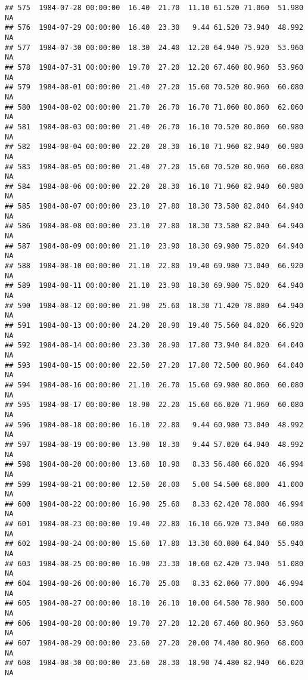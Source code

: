 \documentclass{article}\usepackage{graphicx, color}
\makeatletter
\newenvironment{kframe}{%
 \def\at@end@of@kframe{}%
 \ifinner\ifhmode%
  \def\at@end@of@kframe{\end{minipage}}%
  \begin{minipage}{\columnwidth}%
 \fi\fi%
 \def\FrameCommand##1{\hskip\@totalleftmargin \hskip-\fboxsep
 \colorbox{shadecolor}{##1}\hskip-\fboxsep
     \hskip-\linewidth \hskip-\@totalleftmargin \hskip\columnwidth}%
 \MakeFramed {\advance\hsize-\width
   \@totalleftmargin\z@ \linewidth\hsize
   \@setminipage}}%
 {\par\unskip\endMakeFramed%
 \at@end@of@kframe}
\newenvironment{knitrout}{}{} %
\makeatother
\begin{document}
\begin{knitrout}
\begin{kframe}
\begin{verbatim}
## 575  1984-07-28 00:00:00  16.40  21.70  11.10 61.520 71.060  51.980     NA
## 576  1984-07-29 00:00:00  16.40  23.30   9.44 61.520 73.940  48.992     NA
## 577  1984-07-30 00:00:00  18.30  24.40  12.20 64.940 75.920  53.960     NA
## 578  1984-07-31 00:00:00  19.70  27.20  12.20 67.460 80.960  53.960     NA
## 579  1984-08-01 00:00:00  21.40  27.20  15.60 70.520 80.960  60.080     NA
## 580  1984-08-02 00:00:00  21.70  26.70  16.70 71.060 80.060  62.060     NA
## 581  1984-08-03 00:00:00  21.40  26.70  16.10 70.520 80.060  60.980     NA
## 582  1984-08-04 00:00:00  22.20  28.30  16.10 71.960 82.940  60.980     NA
## 583  1984-08-05 00:00:00  21.40  27.20  15.60 70.520 80.960  60.080     NA
## 584  1984-08-06 00:00:00  22.20  28.30  16.10 71.960 82.940  60.980     NA
## 585  1984-08-07 00:00:00  23.10  27.80  18.30 73.580 82.040  64.940     NA
## 586  1984-08-08 00:00:00  23.10  27.80  18.30 73.580 82.040  64.940     NA
## 587  1984-08-09 00:00:00  21.10  23.90  18.30 69.980 75.020  64.940     NA
## 588  1984-08-10 00:00:00  21.10  22.80  19.40 69.980 73.040  66.920     NA
## 589  1984-08-11 00:00:00  21.10  23.90  18.30 69.980 75.020  64.940     NA
## 590  1984-08-12 00:00:00  21.90  25.60  18.30 71.420 78.080  64.940     NA
## 591  1984-08-13 00:00:00  24.20  28.90  19.40 75.560 84.020  66.920     NA
## 592  1984-08-14 00:00:00  23.30  28.90  17.80 73.940 84.020  64.040     NA
## 593  1984-08-15 00:00:00  22.50  27.20  17.80 72.500 80.960  64.040     NA
## 594  1984-08-16 00:00:00  21.10  26.70  15.60 69.980 80.060  60.080     NA
## 595  1984-08-17 00:00:00  18.90  22.20  15.60 66.020 71.960  60.080     NA
## 596  1984-08-18 00:00:00  16.10  22.80   9.44 60.980 73.040  48.992     NA
## 597  1984-08-19 00:00:00  13.90  18.30   9.44 57.020 64.940  48.992     NA
## 598  1984-08-20 00:00:00  13.60  18.90   8.33 56.480 66.020  46.994     NA
## 599  1984-08-21 00:00:00  12.50  20.00   5.00 54.500 68.000  41.000     NA
## 600  1984-08-22 00:00:00  16.90  25.60   8.33 62.420 78.080  46.994     NA
## 601  1984-08-23 00:00:00  19.40  22.80  16.10 66.920 73.040  60.980     NA
## 602  1984-08-24 00:00:00  15.60  17.80  13.30 60.080 64.040  55.940     NA
## 603  1984-08-25 00:00:00  16.90  23.30  10.60 62.420 73.940  51.080     NA
## 604  1984-08-26 00:00:00  16.70  25.00   8.33 62.060 77.000  46.994     NA
## 605  1984-08-27 00:00:00  18.10  26.10  10.00 64.580 78.980  50.000     NA
## 606  1984-08-28 00:00:00  19.70  27.20  12.20 67.460 80.960  53.960     NA
## 607  1984-08-29 00:00:00  23.60  27.20  20.00 74.480 80.960  68.000     NA
## 608  1984-08-30 00:00:00  23.60  28.30  18.90 74.480 82.940  66.020     NA

\end{verbatim}
\end{kframe}
\end{knitrout}
\end{document}
